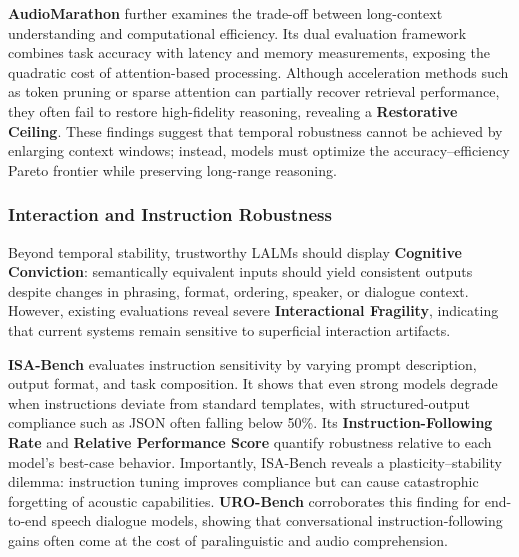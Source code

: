 \textbf{AudioMarathon} \cite{he2025audiomarathon} further examines the trade-off between long-context understanding and computational efficiency. Its dual evaluation framework combines task accuracy with latency and memory measurements, exposing the quadratic cost of attention-based processing. Although acceleration methods such as token pruning or sparse attention can partially recover retrieval performance, they often fail to restore high-fidelity reasoning, revealing a \textbf{Restorative Ceiling}. These findings suggest that temporal robustness cannot be achieved by enlarging context windows; instead, models must optimize the accuracy--efficiency Pareto frontier while preserving long-range reasoning.

\subsubsection{Interaction and Instruction Robustness}
\label{sec:5.2.2}

Beyond temporal stability, trustworthy LALMs should display \textbf{Cognitive Conviction}: semantically equivalent inputs should yield consistent outputs despite changes in phrasing, format, ordering, speaker, or dialogue context. However, existing evaluations reveal severe \textbf{Interactional Fragility}, indicating that current systems remain sensitive to superficial interaction artifacts.

\textbf{ISA-Bench} \cite{li2025isa} evaluates instruction sensitivity by varying prompt description, output format, and task composition. It shows that even strong models degrade when instructions deviate from standard templates, with structured-output compliance such as JSON often falling below 50\%. Its \textbf{Instruction-Following Rate} and \textbf{Relative Performance Score} quantify robustness relative to each model's best-case behavior. Importantly, ISA-Bench reveals a plasticity--stability dilemma: instruction tuning improves compliance but can cause catastrophic forgetting of acoustic capabilities. \textbf{URO-Bench}  \cite{yan2025uro} corroborates this finding for end-to-end speech dialogue models, showing that conversational instruction-following gains often come at the cost of paralinguistic and audio comprehension.

